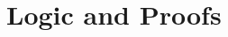 \documentclass[../discrete.tex]{subfiles}
\begin{document}
\chapter{Logic and Proofs}
\end{document}
